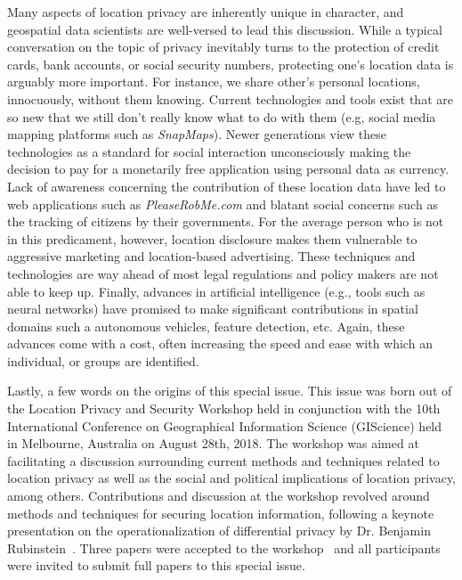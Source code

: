 \documentclass{josised}
\begin{document}
Many aspects of location privacy are inherently unique in character, and geospatial data scientists are well-versed to lead this discussion. While a typical conversation on the topic of privacy inevitably turns to the protection of credit cards, bank accounts, or social security numbers, protecting one’s location data is arguably more important.  For instance, we share other’s personal locations, innocuously, without them knowing.  Current technologies and tools exist that are so new that we still don’t really know what to do with them (e.g, social media mapping platforms such as \textit{SnapMaps}).  Newer generations view these technologies as a standard for social interaction unconsciously making the decision to pay for a monetarily free application using personal data as currency.  Lack of awareness concerning the contribution of these location data have led to web applications such as \textit{PleaseRobMe.com} and blatant social concerns such as the tracking of citizens by their governments.  For the average person who is not in this predicament, however, location disclosure makes them vulnerable to aggressive marketing and location-based advertising. These techniques and technologies are way ahead of most legal regulations and policy makers are not able to keep up.  Finally, advances in artificial intelligence (e.g., tools such as neural networks) have promised to make significant contributions in spatial domains such a autonomous vehicles, feature detection, etc.  Again, these advances come with a cost,  often increasing the speed and ease with which an individual, or groups are identified.

Lastly, a few words on the origins of this special issue.  This issue was born out of the Location Privacy and Security Workshop held in conjunction with the 10th International Conference on Geographical Information Science (GIScience) held in Melbourne, Australia on August 28th, 2018.  The workshop was aimed at facilitating a discussion surrounding current methods and techniques related to location privacy as well as the social and political implications of location privacy, among others. Contributions and discussion at the workshop revolved around methods and techniques for securing location information, following a keynote presentation on the operationalization of differential privacy by Dr. Benjamin Rubinstein~\cite{rubinstein2017diffpriv}.   Three papers were accepted to the workshop~\cite{naghizadeseeking,gao2018,liu2018} and all participants were invited to submit full papers to this special issue.
\end{document}
